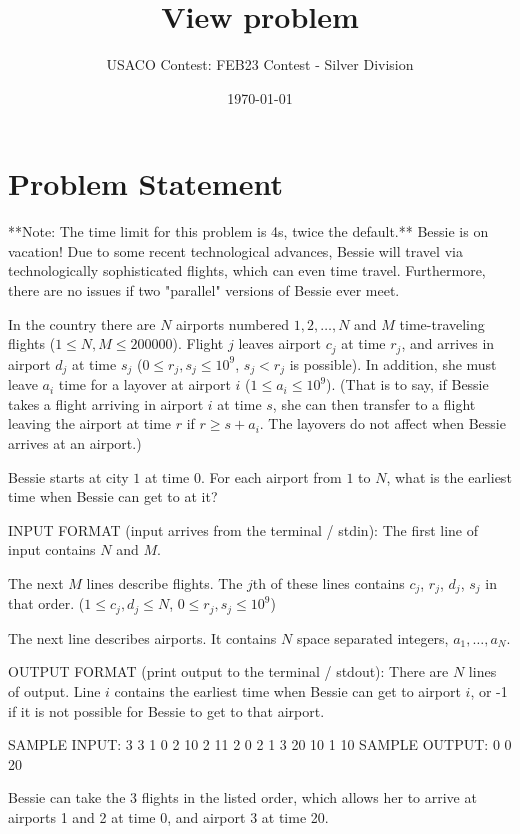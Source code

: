 \documentclass[12pt]{article}
\title{View problem}
\author{USACO Contest: FEB23 Contest - Silver Division}
\date{\today}
\begin{document}
\maketitle

\section*{Problem Statement}


**Note: The time limit for this problem is 4s, twice the default.**
Bessie is on vacation!  Due to some recent technological advances, Bessie will
travel via technologically sophisticated  flights, which can even time travel.
Furthermore, there are no issues if two "parallel" versions of Bessie ever meet.

In the country there are $N$ airports numbered $1, 2, \ldots, N$ and $M$
time-traveling flights ($1\leq N, M \leq 200000$). Flight $j$ leaves airport
$c_j$ at time $r_j$, and arrives in airport $d_j$ at time $s_j$ 
($0 \leq r_j, s_j \leq 10^9$, $s_j < r_j$ is possible).  In addition, she must
leave $a_i$ time for a layover at airport $i$
($1\le a_i\le 10^9$).
(That is to say, if Bessie takes a flight arriving in airport $i$ at time $s$,
she can then transfer to a  flight leaving the airport at time $r$ if
$r \geq s + a_i$. The layovers do not affect when Bessie arrives at an airport.)

Bessie starts at city $1$ at time $0$. For each airport from $1$ to $N$, what is
the earliest time when Bessie can get to at it?

INPUT FORMAT (input arrives from the terminal / stdin):
The first line of input contains $N$ and $M$.

The next $M$ lines describe flights.  The $j$th of these lines contains $c_j$,
$r_j$, $d_j$, $s_j$ in that order. ($1\leq c_j, d_j \leq N$,
$0\leq r_j, s_j \leq 10^9$)

The next line describes airports.  It contains $N$ space separated integers,
$a_1, \ldots, a_N$.

OUTPUT FORMAT (print output to the terminal / stdout):
There are $N$ lines of output.  Line $i$ contains the earliest time when Bessie
can get to airport $i$,  or -1 if it is not possible for Bessie to get to that
airport.

SAMPLE INPUT:
3 3
1 0 2 10
2 11 2 0
2 1 3 20
10 1 10
SAMPLE OUTPUT: 
0
0
20

Bessie can take the 3 flights in the listed order, which allows her to arrive at
airports  1 and 2 at time 0, and airport 3 at time 20.
\end{document}
